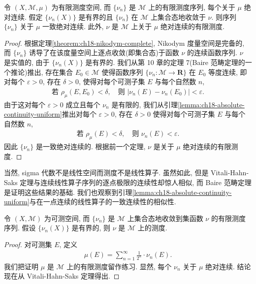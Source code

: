 \documentclass[../../main.tex]{subfiles}
\begin{document}
\begin{theorem}\label{theorem:ch18-vitali-hahn-saks}
令 $(X,\mathcal{M},\mu)$ 为有限测度空间, 而 $\{\nu_{n}\}$ 是 $\mathcal{M}$ 上的有限测度序列, 每个关于 $\mu$ 绝对连续. 假定 $\{\nu_{n}(X)\}$ 是有界的且 $\{\nu_{n}\}$ 在 $\mathcal{M}$ 上集合态地收敛于 $\nu$. 则序列 $\{\nu_{n}\}$ 关于 $\mu$ 一致绝对连续. 此外, $\nu$ 是 $\mathcal{M}$ 上关于 $\mu$ 绝对连续的有限测度.
\end{theorem}

\begin{proof}
根据定理\cref{theorem:ch18-nikodym-complete}, Nikodym 度量空间是完备的, 而 $\{\nu_{n}\}$ 诱导了在该度量空间上逐点收敛(即集合态)于函数 $\nu$ 的连续函数序列. $\nu$ 是实值的, 由于 $\{\nu_{n}(X)\}$ 是有界的. 我们从第 10 章的定理 7(Baire 范畴定理的一个推论)推出, 存在集合 $E_{0}\in\mathcal{M}$ 使得函数序列 $\{\nu_{n}:\mathcal{M}\to\mathbf{R}\}$ 在 $E_{0}$ 等度连续, 即对每个 $\varepsilon>0$, 存在 $\delta>0$, 使得对每个可测子集 $E$ 与每个自然数 $n$,
\begin{align*}
\text{若 }\rho_{\mu}(E,E_{0})<\delta,\quad\text{则 }|\nu_{n}(E)-\nu_{n}(E_{0})|<\varepsilon.
\end{align*}
由于这对每个 $\varepsilon>0$ 成立且每个 $\nu_{n}$ 是有限的, 我们从引理\cref{lemma:ch18-absolute-continuity-uniform}推出对每个 $\varepsilon>0$, 存在 $\delta>0$ 使得对每个可测子集 $E$ 与每个自然数 $n$,
\begin{align*}
\text{若 }\rho_{\mu}(E)<\delta,\quad\text{则 }\nu_{n}(E)<\varepsilon.
\end{align*}
因此 $\{\nu_{n}\}$ 是一致绝对连续的. 根据前一个定理, $\nu$ 是关于 $\mu$ 绝对连续的有限测度.
\end{proof}

\begin{remark}
当然, sigma 代数不是线性空间而测度不是线性算子. 虽然如此, 但是 Vitali-Hahn-Saks 定理与连续线性算子序列的逐点极限的连续性却惊人相似, 而 Baire 范畴定理是证明这些结果的基础. 我们也观察到引理\cref{lemma:ch18-absolute-continuity-uniform}与在一点连续的线性算子的一致连续性的相似性.
\end{remark}

\begin{theorem}[Nikodym]\label{theorem:ch18-nikodym}
令 $(X,\mathcal{M})$ 为可测空间, 而 $\{\nu_{n}\}$ 是 $\mathcal{M}$ 上集合态地收敛到集函数 $\nu$ 的有限测度序列. 假设 $\{\nu_{n}(X)\}$ 是有界的, 则 $\nu$ 是 $\mathcal{M}$ 上的测度.
\end{theorem}

\begin{proof}
对可测集 $E$, 定义
\begin{align}
\mu(E)=\sum_{n=1}^{\infty}\frac{1}{2^{n}}\cdot\nu_{n}(E).\label{align:ch18-nikodym-proof1}
\end{align}
我们把证明 $\mu$ 是 $\mathcal{M}$ 上的有限测度留作练习. 显然, 每个 $\nu_{n}$ 关于 $\mu$ 绝对连续. 结论现在从 Vitali-Hahn-Saks 定理得出.
\end{proof}
\end{document}
